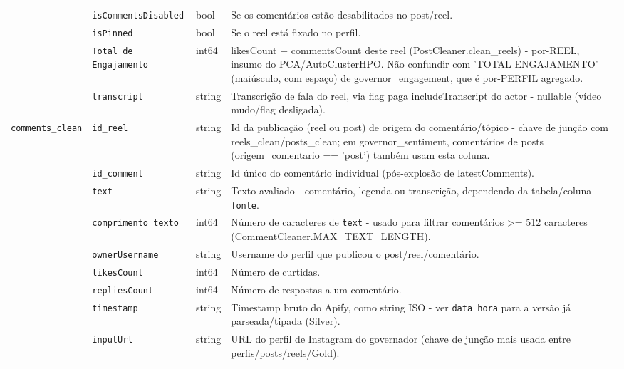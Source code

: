 \begin{footnotesize}
\begin{longtable}{p{3.2cm}p{3.0cm}p{2.0cm}p{6.0cm}}
\texttt{} & \texttt{isCommentsDisabled} & bool & Se os comentários estão desabilitados no post/\allowbreak{}reel. \\
\texttt{} & \texttt{isPinned} & bool & Se o reel está fixado no perfil. \\
\texttt{} & \texttt{Total de Engajamento} & int64 & likesCount + commentsCount deste reel (PostCleaner.clean\_\allowbreak{}reels) - por-REEL, insumo do PCA/\allowbreak{}AutoClusterHPO. Não confundir com 'TOTAL ENGAJAMENTO' (maiúsculo, com espaço) de governor\_\allowbreak{}engagement, que é por-PERFIL agregado. \\
\texttt{} & \texttt{transcript} & string & Transcrição de fala do reel, via flag paga includeTranscript do actor - nullable (vídeo mudo/\allowbreak{}flag desligada). \\
\texttt{comments\_\allowbreak{}clean} & \texttt{id\_\allowbreak{}reel} & string & Id da publicação (reel ou post) de origem do comentário/\allowbreak{}tópico - chave de junção com reels\_\allowbreak{}clean/\allowbreak{}posts\_\allowbreak{}clean; em governor\_\allowbreak{}sentiment, comentários de posts (origem\_\allowbreak{}comentario == 'post') também usam esta coluna. \\
\texttt{} & \texttt{id\_\allowbreak{}comment} & string & Id único do comentário individual (pós-explosão de latestComments). \\
\texttt{} & \texttt{text} & string & Texto avaliado - comentário, legenda ou transcrição, dependendo da tabela/\allowbreak{}coluna \texttt{fonte}. \\
\texttt{} & \texttt{comprimento texto} & int64 & Número de caracteres de \texttt{text} - usado para filtrar comentários >= 512 caracteres (CommentCleaner.MAX\_\allowbreak{}TEXT\_\allowbreak{}LENGTH). \\
\texttt{} & \texttt{ownerUsername} & string & Username do perfil que publicou o post/\allowbreak{}reel/\allowbreak{}comentário. \\
\texttt{} & \texttt{likesCount} & int64 & Número de curtidas. \\
\texttt{} & \texttt{repliesCount} & int64 & Número de respostas a um comentário. \\
\texttt{} & \texttt{timestamp} & string & Timestamp bruto do Apify, como string ISO - ver \texttt{data\_\allowbreak{}hora} para a versão já parseada/\allowbreak{}tipada (Silver). \\
\texttt{} & \texttt{inputUrl} & string & URL do perfil de Instagram do governador (chave de junção mais usada entre perfis/\allowbreak{}posts/\allowbreak{}reels/\allowbreak{}Gold). \\

\end{longtable}
\end{footnotesize}
